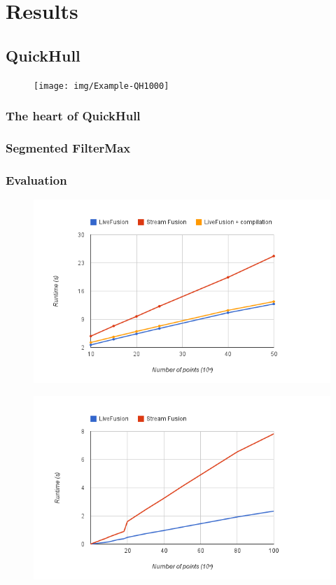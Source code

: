 \documentclass[preamble.tex]{subfiles}
\begin{document}
\clearpage

\chapter{Results}
\label{ch:results}


\section{QuickHull}
\label{sec:quickhull}

\begin{figure}
\texttt{[image: img/Example-QH1000]}
\end{figure}

\subsection{The heart of QuickHull}

\subsection{Segmented FilterMax}

\subsection{Evaluation}

\begin{figure}
\includegraphics[center]{img/Eval-QuickHull}
\end{figure}

\begin{figure}
\includegraphics[center]{img/Eval-FarAndAboves}
\end{figure}
\end{document}
